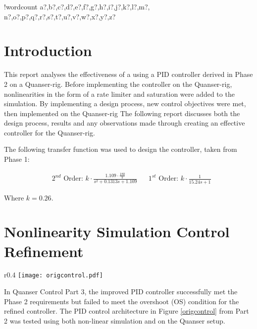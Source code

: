 \documentclass[11pt]{article}
\newcounter{words}
\newenvironment{counted}{%
  \setcounter{words}{0}
  \SearchList!{wordcount}{\stepcounter{words}}
    {a?,b?,c?,d?,e?,f?,g?,h?,i?,j?,k?,l?,m?,
    n?,o?,p?,q?,r?,s?,t?,u?,v?,w?,x?,y?,z?}
  \UndoBoundary{'}
  \SearchOrder{p;}}{%
  \StopSearching}
\begin{document}
\clearpage
{}
\begin{counted} %
\section{Introduction}\label{introduction}

This report analyses the effectiveness of a using a PID controller
derived in Phase 2 on a Quanser-rig. Before implementing the controller
on the Quanser-rig, nonlinearities in the form of a rate limiter and
saturation were added to the simulation. By implementing a design
process, new control objectives were met, then implemented on the
Quanser-rig The following report discusses both the design process,
results and any observations made through creating an effective
controller for the Quanser-rig.

The following transfer function was used to design the controller, taken
from Phase 1:

\begin{align*}
&\text{$2^{nd}$ Order: }k \cdot \frac { 1.109\cdot \frac{180} {\pi} }{ s^2 + 0.1313s +1.109 }
&&\text{$1^{st}$ Order: }k \cdot \frac { 1 }{ 15.24s +1 }
\end{align*}

Where \(k = 0.26\).

\section{Nonlinearity Simulation Control
Refinement}\label{nonlinearity-simulation-control-refinement}

\begin{wrapfigure}{r}{0.4\textwidth}
 \vspace{-25pt}
 \centering
  \texttt{[image: origcontrol.pdf]}
\vspace{-10pt}
  \caption{Showing original Controller Architecture}
  \vspace{-25pt}
  \label{origcontrol}
 \end{wrapfigure}

In Quanser Control Part 3, the improved PID controller successfully met
the Phase 2 requirements but failed to meet the overshoot (OS) condition
for the refined controller. The PID control architecture in Figure
\ref{origcontrol} from Part 2 was tested using both non-linear
simulation and on the Quanser setup.


\end{counted}
\end{document}
